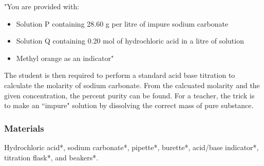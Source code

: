 "You are provided with:
\begin{itemize}
\item{ Solution P containing 28.60 g per litre of impure sodium carbonate}
\item{Solution Q containing 0.20 mol of hydrochloric acid in a litre of solution}
\item{Methyl orange as an indicator}"
\end{itemize}
The student is then required to perform a standard acid base titration to calculate the molarity of sodium carbonate. From the calcuated molarity and the given concentration, the percent purity can be found. For a teacher, the trick is to make an ``impure" solution by dissolving the correct mass of pure substance. 
\subsubsection{Materials}
Hydrochloric acid*, sodium carbonate*, pipette*, burette*, acid/base indicator*, titration flask*, and beakers*.

